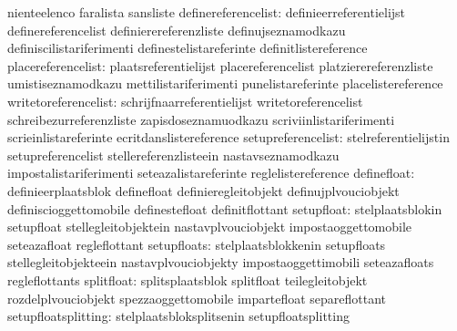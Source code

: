                                   nienteelenco                     faralista
                                  sansliste
             definereferencelist: definieerreferentielijst         definereferencelist
                                  definierereferenzliste           definujseznamodkazu
                                  definiscilistariferimenti        definestelistareferinte
                                  definitlistereference
              placereferencelist: plaatsreferentielijst            placereferencelist
                                  platzierereferenzliste           umistiseznamodkazu
                                  mettilistariferimenti            punelistareferinte
                                  placelistereference
            writetoreferencelist: schrijfnaarreferentielijst       writetoreferencelist
                                  schreibezurreferenzliste         zapisdoseznamuodkazu
                                  scriviinlistariferimenti         scrieinlistareferinte
                                  ecritdanslistereference
              setupreferencelist: stelreferentielijstin            setupreferencelist
                                  stellereferenzlisteein           nastavseznamodkazu
                                  impostalistariferimenti          seteazalistareferinte
                                  reglelistereference
                     definefloat: definieerplaatsblok              definefloat
                                  definieregleitobjekt             definujplvouciobjekt
                                  definiscioggettomobile           definestefloat
                                  definitflottant
                      setupfloat: stelplaatsblokin                 setupfloat
                                  stellegleitobjektein             nastavplvouciobjekt
                                  impostaoggettomobile             seteazafloat
                                  regleflottant
                     setupfloats: stelplaatsblokkenin              setupfloats
                                  stellegleitobjekteein            nastavplvouciobjekty
                                  impostaoggettimobili             seteazafloats
                                  regleflottants
                      splitfloat: splitsplaatsblok                 splitfloat
                                  teilegleitobjekt                 rozdelplvouciobjekt
                                  spezzaoggettomobile              impartefloat
                                  separeflottant
             setupfloatsplitting: stelplaatsbloksplitsenin         setupfloatsplitting
